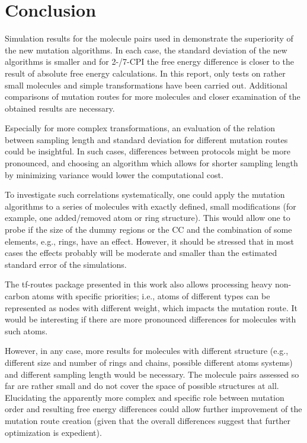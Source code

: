 \chapter{Conclusion}


Simulation results for the molecule pairs used in \cite{Loeffler.2018, Wieder.2022} demonstrate the superiority of the new mutation algorithms. In each case, the standard deviation of the new algorithms is smaller and for 2-/7-CPI the free energy difference is closer to the result of absolute free energy calculations. 
In this report, only tests on rather small molecules and simple transformations have been carried out. Additional comparisons of mutation routes for more molecules and closer examination of the obtained results are necessary.

Especially for more complex transformations, an evaluation of the relation between sampling length and standard deviation for different mutation routes could be insightful. 
In such cases, differences between protocols might be more pronounced, and choosing an algorithm which allows for shorter sampling length by minimizing variance would lower the computational cost.

To investigate such correlations systematically, one could apply the mutation algorithms to a series of molecules with exactly defined, small modifications (for example, one added/removed atom or ring structure). This would allow one to probe if the size of the dummy regions or the CC and the combination of some elements, e.g., rings, have an effect. However, it should be stressed that in most cases the effects probably will be moderate and smaller than the estimated standard error of the simulations.


The tf-routes package presented in this work also allows processing heavy non-carbon atoms with specific priorities; i.e., atoms of different types can be represented as nodes with different weight, which impacts the mutation route. It would be interesting if there are more pronounced differences for molecules with such atoms.

However, in any case, more results for molecules with different structure (e.g., different size and number of rings and chains, possible different atoms systems) and different sampling length would be necessary. The molecule pairs assessed so far are rather small and do not cover the space of possible structures at all.
Elucidating the apparently more complex and specific role between mutation order and resulting free energy differences could allow further improvement of the mutation route creation (given that the overall differences suggest that further optimization is expedient).

